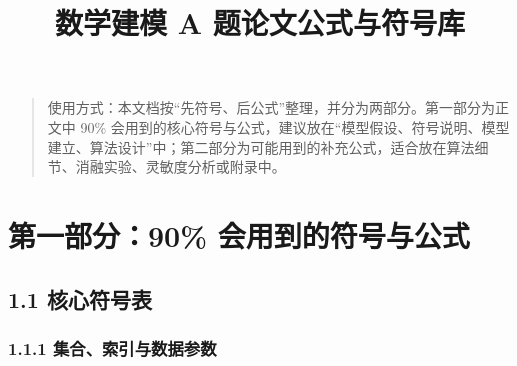 \documentclass[
  a4paper,
]{ctexart}
\title{数学建模 A 题论文公式与符号库}
\author{}
\date{}
\begin{document}
\maketitle

{
\setcounter{tocdepth}{3}
\tableofcontents
}
\begin{quote}
使用方式：本文档按``先符号、后公式''整理，并分为两部分。第一部分为正文中
90\%
会用到的核心符号与公式，建议放在``模型假设、符号说明、模型建立、算法设计''中；第二部分为可能用到的补充公式，适合放在算法细节、消融实验、灵敏度分析或附录中。
\end{quote}

\section{第一部分：90\%
会用到的符号与公式}\label{ux7b2cux4e00ux90e8ux520690-ux4f1aux7528ux5230ux7684ux7b26ux53f7ux4e0eux516cux5f0f}

\subsection{1.1 核心符号表}\label{ux6838ux5fc3ux7b26ux53f7ux8868}

\subsubsection{1.1.1
集合、索引与数据参数}\label{ux96c6ux5408ux7d22ux5f15ux4e0eux6570ux636eux53c2ux6570}
\end{document}
